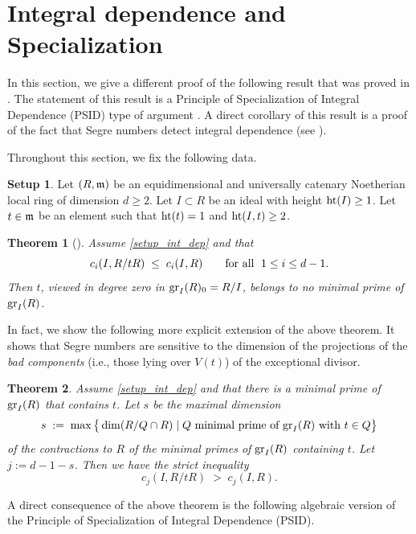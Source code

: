 \documentclass[a4paper, 11pt]{amsart}
\newcommand{\mm}{{\normalfont\mathfrak{m}}}
\newcommand{\HT}{\normalfont\text{ht}}
\newcommand{\gr}{{\normalfont\text{gr}}}
\newtheorem{theorem}{Theorem}[section]
\theoremstyle{definition}
\newtheorem{setup}[setup]{Setup}
\begin{document}
	\section{Integral dependence and Specialization}
	\label{sec:integral-dependence}
	
	In this section, we give a different proof of the following result that was proved in \cite[Theorem 3.3]{PTUV}.
	The statement of this result is a Principle of Specialization of Integral Dependence (PSID) type of argument \cite{GG}.
	A direct corollary of this result is a proof of the fact that Segre numbers detect integral dependence (see \cite[Theorem 4.2]{PTUV}). 
	
	
	Throughout this section, we fix the following data. 
	
	\begin{setup}
		\label{setup_int_dep}
		Let $(R,\mm)$ be an equidimensional and universally catenary Noetherian local ring
		of dimension $d\geq2$. 
		Let $I\subset R$ be an ideal with height $\HT(I) \ge 1$.
		Let $t\in\mm$ be an element such that $\HT(t) = 1$ and $\HT(I, t) \ge 2$.
	\end{setup}
	
	
	\begin{theorem}[{\cite[Theorem 3.3]{PTUV}}]\label{thm:avoidance_main}
		Assume \autoref{setup_int_dep} and  that
		$$
		c_i(I,R/tR) \;\le\; c_i(I,R)\qquad\text{for all \;}1\leq i\leq d-1 .
		$$
		Then $t$, viewed in degree zero in $\gr_I(R)_0=R/I$, belongs to no minimal
		prime of $\gr_I(R)$.
	\end{theorem}
	
	In fact, we show the following more explicit extension of the above theorem. 
	It shows that Segre numbers are sensitive to the dimension of the projections of the \emph{bad components} (i.e., those lying over $V(t)$) of the exceptional divisor. 
	
	\begin{theorem}\label{thm:avoidance_main_explicit}
		Assume \autoref{setup_int_dep} and that there is a minimal prime of $\gr_I(R)$ that contains $t$. 
		Let $s$ be the maximal dimension
		$$
		s \;:=\; \max\big\lbrace \dim(R/Q \cap R) \mid \text{$Q$ minimal prime of $\gr_I(R)$ with $t \in Q$}\big\rbrace
		$$
		of the contractions to $R$ of the minimal primes of $\gr_I(R)$ containing $t$.
		Let $j := d-1-s$.
		Then we have the strict inequality
		$$
		c_j(I, R/tR) \;>\; c_j(I, R).
		$$
	\end{theorem}
	
	A direct consequence of the above theorem is the following algebraic version of the Principle of Specialization of Integral Dependence (PSID).
	
\end{document}
